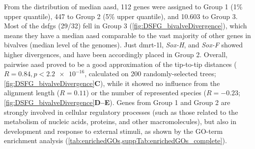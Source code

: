 From the distribution of median \gls{aasd}, 112 genes were assigned to Group 1 (1\% upper quantile), 447 to Group 2 (5\% upper quantile), and 10.603 to Group 3. Most of the \glspl{dsfg} (29/32) fell in Group 3 (\cref{fig:DSFG_bivalveDivergence}), which means they have a median \gls{aasd} comparable to the vast majority of other genes in bivalves (median level of the genomes). Just \gls{dmrt-1l}, \textit{Sox-H}, and \textit{Sox-F} showed higher divergences, and have been accordingly placed in Group 2. Overall, pairwise \gls{aasd} proved to be a good approximation of the tip-to-tip distances ($R = 0.84, p < \num{2.2e-16}$, calculated on 200 randomly-selected trees; \cref{fig:DSFG_bivalveDivergence}\textbf{C}), while it showed no influence from the alignment length ($R = 0.11$) or the number of represented species ($R = -0.23$; \cref{fig:DSFG_bivalveDivergence}\textbf{D--E}). Genes from Group 1 and Group 2 are strongly involved in cellular regulatory processes (such as those related to the metabolism of nucleic acids, proteins, and other macromolecules), but also in development and response to external stimuli, as shown by the GO-term enrichment analysis (\cref{tab:enrichedGOs,suppTab:enrichedGOs_complete}).

